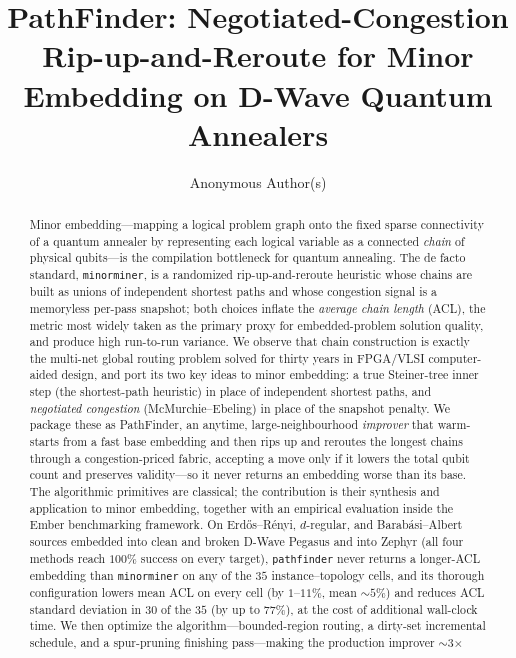 \documentclass[acmsmall,anonymous,nonacm]{acmart}
\begin{document}
\title{PathFinder: Negotiated-Congestion Rip-up-and-Reroute for Minor Embedding
on D-Wave Quantum Annealers}

\author{Anonymous Author(s)}

\begin{abstract}
Minor embedding---mapping a logical problem graph onto the fixed sparse
connectivity of a quantum annealer by representing each logical variable as a
connected \emph{chain} of physical qubits---is the compilation bottleneck for
quantum annealing. The de facto standard, \texttt{minorminer}, is a randomized
rip-up-and-reroute heuristic whose chains are built as unions of independent
shortest paths and whose congestion signal is a memoryless per-pass snapshot;
both choices inflate the \emph{average chain length} (ACL), the metric most
widely taken as the primary proxy for embedded-problem solution quality, and
produce high run-to-run variance. We observe that chain construction is exactly the multi-net global
routing problem solved for thirty years in FPGA/VLSI computer-aided design, and
port its two key ideas to minor embedding: a true Steiner-tree inner step
(the shortest-path heuristic) in place of independent shortest paths, and
\emph{negotiated congestion} (McMurchie--Ebeling) in place of the snapshot
penalty. We package these as PathFinder, an anytime, large-neighbourhood
\emph{improver} that warm-starts from a fast base embedding and then rips up and
reroutes the longest chains through a congestion-priced fabric, accepting a move
only if it lowers the total qubit count and preserves validity---so it never
returns an embedding worse than its base. The algorithmic primitives are classical; the
contribution is their synthesis and application to minor embedding, together
with an empirical evaluation inside the Ember benchmarking framework. On
Erd\H{o}s--R\'enyi, $d$-regular, and Barab\'asi--Albert sources embedded into
clean and broken D-Wave Pegasus and into Zephyr (all four methods reach $100\%$
success on every target), \texttt{pathfinder} never returns a longer-ACL
embedding than \texttt{minorminer} on any of the $35$ instance--topology cells,
and its thorough configuration lowers mean ACL on every cell (by $1$--$11\%$,
mean ${\sim}5\%$) and reduces ACL standard deviation in $30$ of the $35$ (by up
to $77\%$), at the cost of additional wall-clock time. We then optimize the
algorithm---bounded-region routing, a dirty-set incremental schedule, and a
spur-pruning finishing pass---making the production improver $\sim$3$\times$

\end{abstract}
\end{document}
